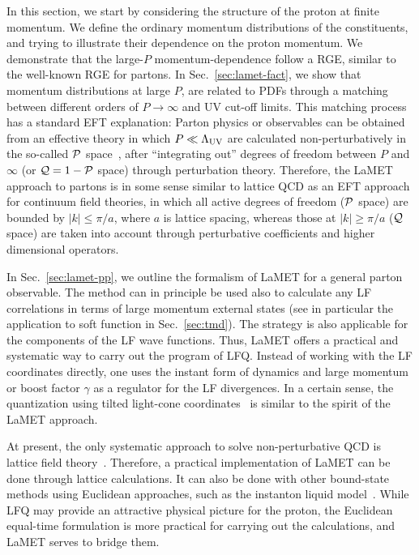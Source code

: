 \documentclass[aps,rmp,reprint,amsmath,amssymb,graphicx,longbibliography]{revtex4-1} %
\DeclareRobustCommand{\sec}[1]{Sec.~\ref{sec:#1}}
\begin{document}
In this section, we start by considering the structure
of the proton at finite momentum. We define the
ordinary momentum distributions of the constituents,
and trying to illustrate their dependence on
the proton momentum. We demonstrate that the large-$P$ momentum-dependence
follow a RGE, similar to the
well-known RGE for partons. In \sec{lamet-fact},
we show that momentum distributions at large $P$,
are related to PDFs through a matching between different orders of
$P\to \infty$ and UV cut-off limits. This matching process has a standard EFT
explanation: Parton physics or observables
can be obtained from an effective theory in which
$P\ll \Lambda_{\rm UV}$ are calculated non-perturbatively in the so-called ${\cal P}$ space~\cite{Messiah:1979eg},
after ``integrating out'' degrees of freedom between $P$ and $\infty$  (or ${\cal Q}=1-{\cal P}$ space)
through perturbation theory. Therefore, the LaMET approach to partons
is in some sense similar to lattice QCD  as an EFT approach for continuum field theories,
in which all active degrees of freedom (${\cal P}$ space) are bounded by $|k| \le \pi/a$,
where $a$ is lattice spacing, whereas those at $|k| \ge \pi/a$ (${\cal Q}$ space) are taken into account through
perturbative coefficients and higher dimensional operators.

In \sec{lamet-pp}, we outline the formalism
of LaMET for a general parton observable. The method
can in principle be used also to calculate any LF
correlations in terms of large momentum external states (see in particular the application to
soft function in \sec{tmd}).
The strategy is also applicable for the components of the LF wave functions.
Thus, LaMET offers a practical and systematic way to carry out the program of
LFQ. Instead of working with the LF coordinates directly, one uses the
instant form of dynamics and large momentum or boost factor $\gamma$ as a
regulator for the LF divergences. In a certain sense, the
quantization using tilted light-cone coordinates~\cite{Lenz:1991sa} is
similar to the spirit of the LaMET approach.

At present, the only systematic approach to solve non-perturbative QCD
is lattice field theory~\cite{Wilson:1974sk}. Therefore,
a practical implementation of LaMET can be done
through lattice calculations.  It can also be done
with other bound-state methods using Euclidean approaches, such as the
instanton liquid model~\cite{Schafer:1996wv}. While LFQ may provide an attractive physical picture for the proton,
the Euclidean equal-time formulation is more practical for carrying out the
calculations, and LaMET serves to bridge them.
\end{document}
